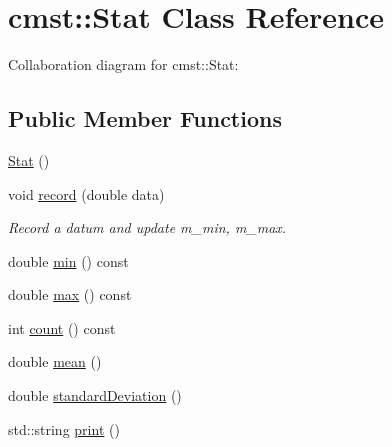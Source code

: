 \hypertarget{classcmst_1_1_stat}{}\section{cmst\+:\+:Stat Class Reference}
\label{classcmst_1_1_stat}


Collaboration diagram for cmst\+:\+:Stat\+:
\subsection*{Public Member Functions}
\begin{DoxyCompactItemize}
\item 
\hyperlink{classcmst_1_1_stat_a1f07a880a815c7efe4e4d244fb0c6b7d}{Stat} ()
\item 
void \hyperlink{classcmst_1_1_stat_ab1e2fe7c367da505a6b5f1fb5eb619d2}{record} (double data)
\begin{DoxyCompactList}\small\item\em Record a datum and update m\+\_\+min, m\+\_\+max. \end{DoxyCompactList}\item 
double \hyperlink{classcmst_1_1_stat_a1a6a92dee526145fb289d79a94afe3ae}{min} () const 
\item 
double \hyperlink{classcmst_1_1_stat_ab42898f6611aa9f1ad028f99c3d4242a}{max} () const 
\item 
int \hyperlink{classcmst_1_1_stat_ab8c6707fa4739fda8b27a2481df25c35}{count} () const 
\item 
double \hyperlink{classcmst_1_1_stat_aa40d8d516e7f866146d91866d63faf2b}{mean} ()
\item 
double \hyperlink{classcmst_1_1_stat_abfbaefc3a4174643a2eb282251fd86a5}{standard\+Deviation} ()
\item 
std\+::string \hyperlink{classcmst_1_1_stat_a03d1a0f52e2ea72cfab11a426726aea4}{print} ()
\end{DoxyCompactItemize}
